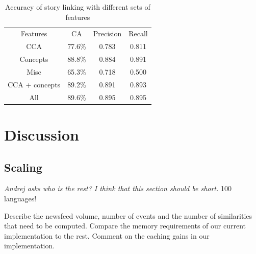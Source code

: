 \documentclass[twoside,11pt]{article}
\begin{document}
\begin{table}[h]
\caption{Accuracy of story linking with different sets of features}
\label{table:linkingEval}
\begin{center}
\begin{tabular}{|c|c|c|c|}
  \hline
  \cline{1-4}
  Features & CA & Precision & Recall \\ \cline{1-4}
  CCA & 77.6\% & 0.783 & 0.811 \\ \cline{1-4}
  Concepts & 88.8\% & 0.884 & 0.891 \\ \cline{1-4}
  Misc & 65.3\% & 0.718 & 0.500 \\ \cline{1-4}
  CCA + concepts & 89.2\% & 0.891 & 0.893 \\ \cline{1-4}
  All & 89.6\% & 0.895 & 0.895 \\ \cline{1-4}
  \hline
\end{tabular}
\end{center}
\end{table}


\section{Discussion}


\subsection{Scaling}
\emph{Andrej asks who is the rest? I think that this section should be short.}
100 languages!

Describe the newsfeed volume, number of events and the number of similarities that need to be computed. Compare the memory requirements of our current implementation to the rest.
Comment on the caching gains in our implementation.



\vskip 0.2in


\end{document}
